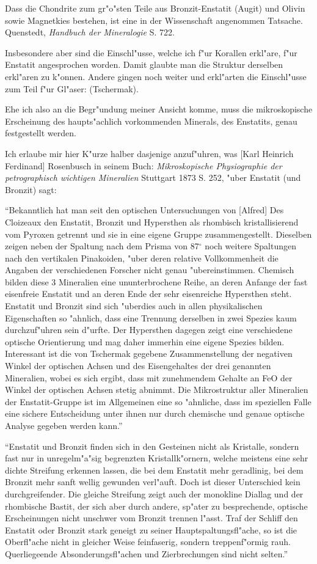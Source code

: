 \documentclass[a4paper, 11pt, oneside]{article}
\begin{document}
Dass die Chondrite zum gr"o"sten Teile aus Bronzit-Enstatit (Augit) und Olivin sowie Magnetkies bestehen, ist eine in der Wissenschaft angenommen Tatsache. Quenstedt, \emph{Handbuch der Mineralogie} S. 722.

Insbesondere aber sind die Einschl"usse, welche ich f"ur Korallen erkl"are, f"ur Enstatit angesprochen worden. Damit glaubte man die Struktur derselben erkl"aren zu k"onnen. Andere gingen noch weiter und erkl"arten die Einschl"usse zum Teil f"ur Gl"aser: (Tschermak).

Ehe ich also an die Begr"undung meiner Ansicht komme, muss die mikroskopische Erscheinung des haupts"achlich vorkommenden Minerals, des Enstatits, genau festgestellt werden.

Ich erlaube mir hier K"urze halber dasjenige anzuf"uhren, was [Karl Heinrich Ferdinand] Rosenbusch in seinem Buch: \emph{Mikroskopische Physiographie der petrographisch wichtigen Mineralien} Stuttgart 1873 S. 252, "uber Enstatit (und Bronzit) sagt:

"`Bekanntlich hat man seit den optischen Untersuchungen von [Alfred] Des Cloizeaux den Enstatit, Bronzit und Hypersthen als rhombisch kristallisierend vom Pyroxen getrennt und sie in eine eigene Gruppe zusammengestellt. Dieselben zeigen neben der Spaltung nach dem Prisma von 87$^{\circ}$ noch weitere Spaltungen nach den vertikalen Pinakoiden, "uber deren relative Vollkommenheit die Angaben der verschiedenen Forscher nicht genau "ubereinstimmen. Chemisch bilden diese 3 Mineralien eine ununterbrochene Reihe, an deren Anfange der fast eisenfreie Enstatit und an deren Ende der sehr eisenreiche Hypersthen steht. Enstatit und Bronzit sind sich "uberdies auch in allen physikalischen Eigenschaften so "ahnlich, dass eine Trennung derselben in zwei Spezies kaum durchzuf"uhren sein d"urfte. Der Hypersthen dagegen zeigt eine verschiedene optische Orientierung und mag daher immerhin eine eigene Spezies bilden. Interessant ist die von Tschermak gegebene Zusammenstellung der negativen Winkel der optischen Achsen und des Eisengehaltes der drei genannten Mineralien, wobei es sich ergibt, dass mit zunehmendem Gehalte an FeO der Winkel der optischen Achsen stetig abnimmt. Die Mikrostruktur aller Mineralien der Enstatit-Gruppe ist im Allgemeinen eine so "ahnliche, dass im speziellen Falle eine sichere Entscheidung unter ihnen nur durch chemische und genaue optische Analyse gegeben werden kann."'

"`Enstatit und Bronzit finden sich in den Gesteinen nicht als Kristalle, sondern fast nur in unregelm"a"sig begrenzten Kristallk"ornern, welche meistens eine sehr dichte Streifung erkennen lassen, die bei dem Enstatit mehr geradlinig, bei dem Bronzit mehr sanft wellig gewunden verl"auft. Doch ist dieser Unterschied kein durchgreifender. Die gleiche Streifung zeigt auch der monokline Diallag und der rhombische Bastit, der sich aber durch andere, sp"ater zu besprechende, optische Erscheinungen nicht unschwer vom Bronzit trennen l"asst. Traf der Schliff den Enstatit oder Bronzit stark geneigt zu seiner Hauptspaltungsfl"ache, so ist die Oberfl"ache nicht in gleicher Weise feinfaserig, sondern treppenf"ormig rauh. Querliegeende Absonderungsfl"achen und Zierbrechungen sind nicht selten."'
\end{document}
